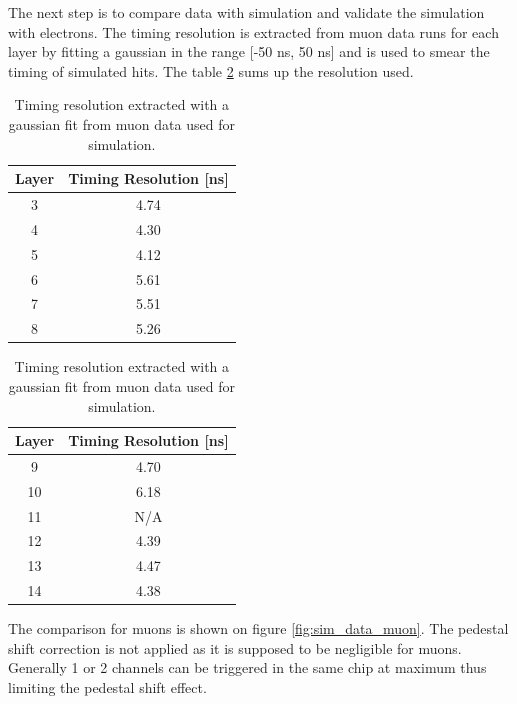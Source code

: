 \documentclass[twoside,a4paper,11pt]{article}
\begin{document}
The next step is to compare data with simulation and validate the simulation with electrons. The timing resolution is extracted from muon data runs for each layer by fitting a gaussian in the range [-50 ns, 50 ns] and is used to smear the timing of simulated hits. The table \ref{table:time_res_sim} sums up the resolution used.
\begin{table}[htbp]
\centering
  \begin{tabular}{@{} cc @{}}
    \hline
    Layer & Timing Resolution [ns] \\ 
    \hline
     3 & 4.74 \\ 
     4 & 4.30 \\
     5 & 4.12 \\
	 6 & 5.61 \\
	 7 & 5.51 \\
	 8 & 5.26 \\
    \hline
  \end{tabular}
  \hspace{2ex}
  \begin{tabular}{@{} cc @{}}
    \hline
    Layer & Timing Resolution [ns] \\ 
    \hline
	 9 & 4.70 \\
	 10 & 6.18 \\
	 11 & N/A \footnotemark[1] \\
	 12 & 4.39 \\
	 13 & 4.47 \\
	 14 & 4.38 \\
	\hline
  \end{tabular}
  \caption{Timing resolution extracted with a gaussian fit from muon data used for simulation.}
  \label{table:time_res_sim}
\end{table}
The comparison for muons is shown on figure \ref{fig:sim_data_muon}. The pedestal shift correction is not applied as it is supposed to be negligible for muons. Generally 1 or 2 channels can be triggered in the same chip at maximum thus limiting the pedestal shift effect. 
\end{document}

